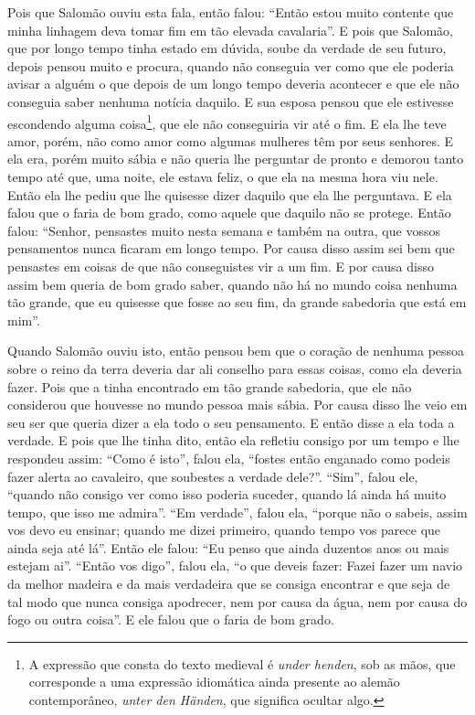 Pois que Salomão ouviu esta fala, então falou: “Então estou muito contente que
minha linhagem deva tomar fim em tão elevada cavalaria”. E pois que
Salomão, que por longo tempo tinha estado em dúvida, soube da verdade de seu
futuro, depois pensou muito e procura, quando não conseguia ver como que ele
poderia avisar a alguém o que depois de um longo tempo deveria acontecer e que
ele não conseguia saber nenhuma notícia daquilo. E sua esposa pensou que ele
estivesse escondendo alguma coisa\footnote{ A expressão que consta do texto
medieval é \textit{under henden}, sob as mãos, que corresponde a uma expressão
idiomática ainda presente ao alemão contemporâneo, \textit{unter den Händen},
que significa ocultar algo.},  que ele não conseguiria vir até o
fim. E ela lhe teve amor, porém, não como amor como algumas mulheres têm por
seus senhores. E ela era, porém muito sábia e não queria lhe perguntar de
pronto e demorou tanto tempo até que, uma noite, ele estava feliz, o que ela na
mesma hora viu nele. Então ela lhe pediu que lhe quisesse dizer daquilo que ela
lhe perguntava. E ela falou que o faria de bom grado, como aquele que daquilo
não se protege. Então falou: “Senhor, pensastes muito nesta semana e também na
outra, que vossos pensamentos nunca ficaram em longo tempo. Por causa disso
assim sei bem que pensastes em coisas de que não conseguistes vir a um fim. E
por causa disso assim bem queria de bom grado saber, quando não há no mundo
coisa nenhuma tão grande, que eu quisesse que fosse ao seu fim, da grande
sabedoria que está em mim”. 

 Quando Salomão ouviu isto, então pensou bem que o coração de nenhuma pessoa
sobre o reino da terra deveria dar ali conselho para essas coisas, como ela
deveria fazer. Pois que a tinha encontrado em tão grande sabedoria, que ele não
considerou que houvesse no mundo pessoa mais sábia. Por causa disso lhe veio em
seu ser que queria dizer a ela todo o seu pensamento. E então disse a ela toda
a verdade. E pois que lhe tinha dito, então ela refletiu consigo por um tempo e
lhe respondeu assim: “Como é isto”, falou ela, “fostes então enganado como
podeis fazer alerta ao cavaleiro, que soubestes a verdade dele?”. “Sim”, falou
ele, “quando não consigo ver como isso poderia suceder, quando lá ainda há
muito tempo, que isso me admira”. “Em verdade”, falou ela, “porque não o
sabeis, assim vos devo eu ensinar; quando me dizei primeiro, quando tempo vos
parece que ainda seja até lá”. Então ele falou: “Eu penso que ainda duzentos
anos ou mais estejam ai”. “Então vos digo”, falou ela, “o que deveis fazer:
Fazei fazer um navio da melhor madeira e da mais verdadeira que se consiga
encontrar e que seja de tal modo que nunca consiga apodrecer, nem por causa da
água, nem por causa do fogo ou outra coisa”. E ele falou que o faria de bom
grado. 

